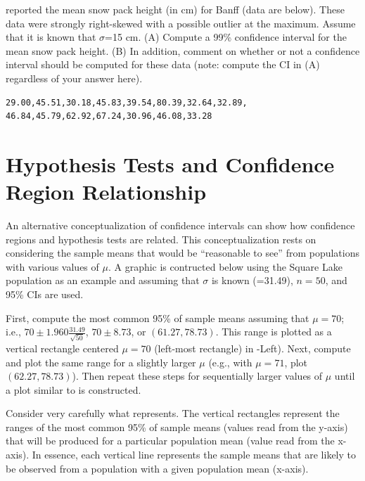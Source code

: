 \documentclass[10pt,openany]{book}\usepackage[]{graphicx}\usepackage[]{color}
\begin{document}
\begin{exsection}
  \item \label{revex:CIsnow} \rhw{} \cite{Hebblewhite2000} reported the mean snow pack height (in cm) for Banff (data are below).  These data were strongly right-skewed with a possible outlier at the maximum.  Assume that it is known that $\sigma$=15 cm.  (A) Compute a 99\% confidence interval for the mean snow pack height.  (B) In addition, comment on whether or not a confidence interval should be computed for these data (note: compute the CI in (A) regardless of your answer here). 
  \begin{Verbatim}
29.00,45.51,30.18,45.83,39.54,80.39,32.64,32.89,
46.84,45.79,62.92,67.24,30.96,46.08,33.28
  \end{Verbatim}
\end{exsection}


\section[Inference Type Relationship]{Hypothesis Tests and Confidence Region Relationship}
\vspace{-12pt}
An alternative conceptualization of confidence intervals can show how confidence regions and hypothesis tests are related. This conceptualization rests on considering the sample means that would be ``reasonable to see'' from populations with various values of $\mu$. A graphic is contructed below using the Square Lake population as an example and assuming that $\sigma$ is known (=31.49), $n=50$, and 95\% CIs are used.

First, compute the most common 95\% of sample means assuming that $\mu=70$; i.e., $70 \pm 1.960\frac{31.49}{\sqrt{50}}$, $70 \pm 8.73$, or $(61.27,78.73)$. This range is plotted as a vertical rectangle centered $\mu=70$ (left-most rectangle) in -Left). Next, compute and plot the same range for a slightly larger $\mu$ (e.g., with $\mu=71$, plot $(62.27,78.73)$). Then repeat these steps for sequentially larger values of $\mu$ until a plot similar to  is constructed.

Consider very carefully what  represents.  The vertical rectangles represent the ranges of the most common 95\% of sample means (values read from the y-axis) that will be produced for a particular population mean (value read from the x-axis).  In essence, each vertical line represents the sample means that are likely to be observed from a population with a given population mean (x-axis).
\end{document}

